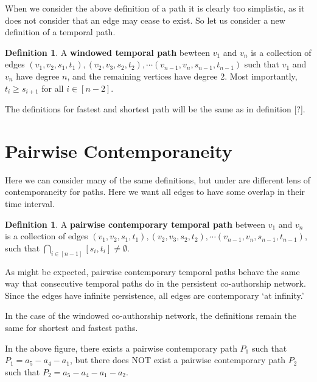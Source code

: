 \documentclass{article}
\theoremstyle{definition}
\newtheorem{defn}[thm]{Definition}
\numberwithin{thm}{subsection}
\begin{document}
When we consider the above definition of a path it is clearly too
simplistic, as it does not consider that an edge may cease to exist. So let
us consider a new definition of a temporal path.

\begin{defn}
  A \textbf{windowed temporal path} bewteen $v_1$ and $v_n$ is a collection of
  edges $(v_1,v_2,s_1,t_1),(v_2,v_3,s_2,t_2), \cdots (v_{n-1},v_{n}, s_{n-1},
  t_{n-1})$ such that $v_1$ and $v_n$ have degree $n$, and the remaining
  vertices have degree 2.  Most importantly, $t_i \geq s_{i+1}$ for all $i \in
  [n-2]$.
\end{defn}

The definitions for fastest and shortest path will be the same as in definition
[?].


\section{Pairwise Contemporaneity}

Here we can consider many of the same definitions, but under are different
lens of contemporaneity for paths. Here we want all edges to have some overlap
in their time interval.

\begin{defn}
  A \textbf{pairwise contemporary temporal path} between $v_1$ and $v_n$ is a
  collection of edges $(v_1,v_2,s_1,t_1), (v_2,v_3,s_2,t_2), \cdots (v_{n-1},
  v_n,s_{n-1}, t_{n-1})$, such that $\bigcap_{i \in [n-1]} [s_i, t_i]
  \neq \emptyset$.
\end{defn}

As might be expected, pairwise contemporary temporal paths behave the same way
that consecutive temporal paths do in the persistent co-authorship network.
Since the edges have infinite persistence, all edges are contemporary `at
infinity.'

In the case of the windowed co-authorship network, the definitions remain the
same for shortest and fastest paths.

\begin{center}
\end{center}

In the above figure, there exists a pairwise contemporary path $P_1$ such that
$P_1 = a_5-a_4-a_1$, but there does NOT exist a pairwise contemporary path
$P_2$ such that $P_2 = a_5-a_4-a_1-a_2$.
\end{document}
